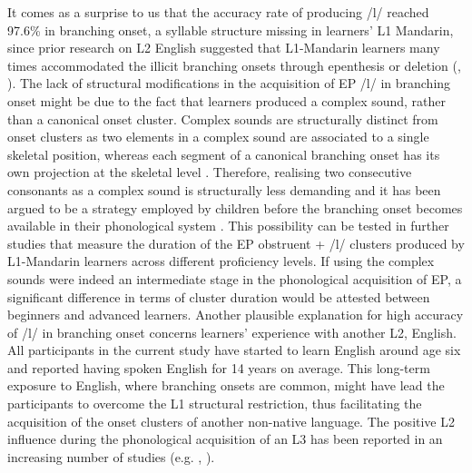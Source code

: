 \documentclass[output=paper]{../langscibook}
\begin{document}
It comes as a surprise to us that the accuracy rate of producing /l/ reached 97.6\% in branching onset, a syllable structure missing in learners’ L1 Mandarin, since prior research on L2 English suggested that L1-Mandarin learners many times accommodated the illicit branching onsets through epenthesis or deletion (\citealt{Chen2003}, \citealt{Enochson2014}). The lack of structural modifications in the acquisition of EP /l/ in branching onset might be due to the fact that learners produced a complex sound, rather than a canonical onset cluster. Complex sounds are structurally distinct from onset clusters as two elements in a complex sound are associated to a single skeletal position, whereas each segment of a canonical branching onset has its own projection at the skeletal level \citep{Selkirk1982}. Therefore, realising two consecutive consonants as a complex sound is structurally less demanding and it has been argued to be a strategy employed by children before the branching onset becomes available in their phonological system \citep{Freitas2003}. This possibility can be tested in further studies that measure the duration of the EP obstruent + /l/ clusters produced by L1-Mandarin learners across different proficiency levels. If using the complex sounds were indeed an intermediate stage in the phonological acquisition of EP, a significant difference in terms of cluster duration would be attested between beginners and advanced learners. Another plausible explanation for high accuracy of /l/ in branching onset concerns learners’ experience with another L2, English. All participants in the current study have started to learn English around age six and reported having spoken English for 14 years on average. This long-term exposure to English, where branching onsets are common, might have lead the participants to overcome the L1 structural restriction, thus facilitating the acquisition of the onset clusters of another non-native language. The positive L2 influence during the phonological acquisition of an L3 has been reported in an increasing number of studies (e.g. \citealt{Tremblay2007}, \citealt{LlamaEtAl2010}).
\end{document}

